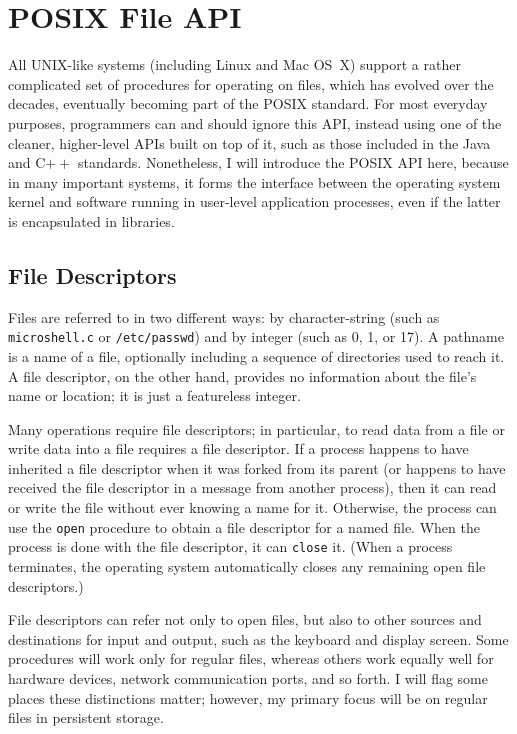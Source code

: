 \section{POSIX File API}\label{posix-file-api-section}

All UNIX-like systems (including Linux and Mac OS~X) support a rather
complicated set of procedures for operating on files, which has
evolved over the decades, eventually becoming part of the POSIX
standard.  For most everyday purposes, programmers can and should
ignore this API, instead using one of the cleaner, higher-level APIs
built on top of it, such as those included in the Java and C$++$
standards.  Nonetheless, I will introduce the POSIX API here,
because in many important systems, it forms the interface between the
operating system kernel and software running in user-level application
processes, even if the latter is encapsulated in libraries.

\subsection{File Descriptors}

Files are referred to in two different ways: by character-string
(such as {\tt microshell.c} or {\tt /etc/passwd}) and by integer
 (such as 0, 1, or 17).
A pathname is a name of a file, optionally including a sequence of
directories used to reach it.  A file descriptor, on the other hand,
provides no information about the file's name or location; it is just
a featureless integer.

Many operations
require file descriptors; in particular, to read data from a file or
write data into a file requires a file descriptor.  If a process
happens to have inherited a file descriptor when it was forked from
its parent (or happens to have received the file descriptor in a
message from another process), then it can read or write the file
without ever knowing a name for it.  Otherwise, the process can use
the \verb|open| procedure to obtain a file
descriptor for a named file.  When the process is done
with the file descriptor, it can
\verb|close| it.  (When a process
terminates, the operating system automatically closes any remaining
open file descriptors.)

File descriptors can refer not only to open files, but also to other
sources and destinations for input and output, such as the keyboard
and display screen.  Some procedures will work only for regular files,
whereas others work equally well for hardware devices, network
communication ports, and so forth.  I will flag some places these distinctions
matter; however, my primary focus will be on regular files in persistent storage.

